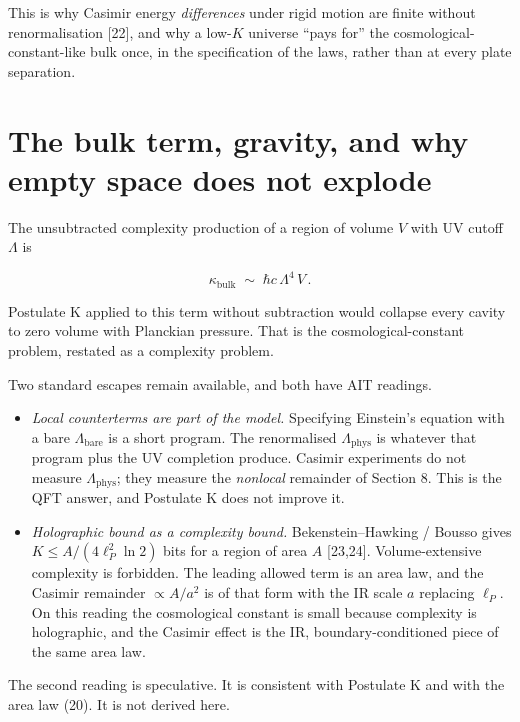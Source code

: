 \documentclass[11pt,letterpaper]{article}
\begin{document}
This is why Casimir energy \emph{differences} under rigid motion are finite without renormalisation [22], and why a low-\(K\) universe “pays for” the cosmological-constant-like bulk once, in the specification of the laws, rather than at every plate separation.



\section{The bulk term, gravity, and why empty space does not explode}


The unsubtracted complexity production of a region of volume \(V\) with UV cutoff \(\Lambda\) is


\[
\kappa_{\mathrm{bulk}}\;\sim\;\hbar c\,\Lambda^{4}\,V\,.
\tag{24}
\]


Postulate K applied to this term without subtraction would collapse every cavity to zero volume with Planckian pressure. That is the cosmological-constant problem, restated as a complexity problem.


Two standard escapes remain available, and both have AIT readings.


\begin{itemize}
\item \emph{Local counterterms are part of the model.} Specifying Einstein’s equation with a bare \(\Lambda_{\mathrm{bare}}\) is a short program. The renormalised \(\Lambda_{\mathrm{phys}}\) is whatever that program plus the UV completion produce. Casimir experiments do not measure \(\Lambda_{\mathrm{phys}}\); they measure the \emph{nonlocal} remainder of Section 8. This is the QFT answer, and Postulate K does not improve it.
\item \emph{Holographic bound as a complexity bound.} Bekenstein–Hawking / Bousso gives \(K\le A/(4\ell_P^{2}\ln 2)\) bits for a region of area \(A\) [23,24]. Volume-extensive complexity is forbidden. The leading allowed term is an area law, and the Casimir remainder \(\propto A/a^{2}\) is of that form with the IR scale \(a\) replacing \(\ell_P\). On this reading the cosmological constant is small because complexity is holographic, and the Casimir effect is the IR, boundary-conditioned piece of the same area law.
\end{itemize}


The second reading is speculative. It is consistent with Postulate K and with the area law (20). It is not derived here.
\end{document}
